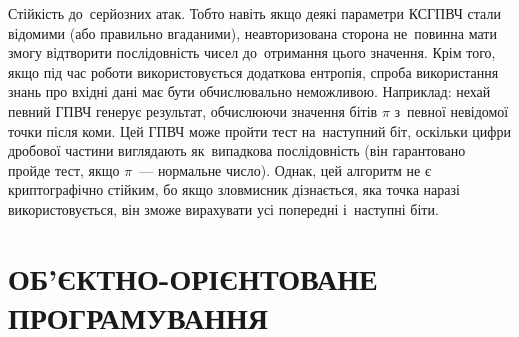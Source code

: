 \documentclass[a4paper,oneside,titlepage,14pt]{extarticle}
\begin{document}
			Стійкість до~серйозних атак. Тобто навіть якщо деякі параметри КСГПВЧ стали відомими (або правильно вгаданими), неавторизована сторона не~повинна мати змогу відтворити послідовність чисел до~отримання цього значення. Крім того, якщо під час роботи використовується додаткова ентропія, спроба використання знань про вхідні дані має бути обчислювально неможливою. Наприклад: нехай певний ГПВЧ генерує результат, обчислюючи значення бітів $\pi$ з~певної невідомої точки після коми. Цей ГПВЧ може пройти тест на~наступний біт, оскільки цифри дробової частини виглядають як~випадкова послідовність (він гарантовано пройде тест, якщо $\pi$~--- нормальне число). Однак, цей алгоритм не є криптографічно стійким, бо якщо зловмисник дізнається, яка точка наразі використовується, він зможе вирахувати усі попередні і~наступні біти.\par
			\par
			\newpage
			
	\section{ОБ'\-ЄКТ\-НО-ОРІЄНТОВАНЕ ПРОГРАМУВАННЯ}
\end{document}
